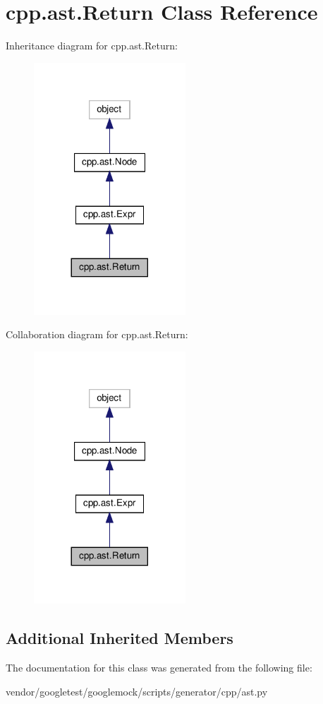 \hypertarget{classcpp_1_1ast_1_1_return}{}\section{cpp.\+ast.\+Return Class Reference}
\label{classcpp_1_1ast_1_1_return}


Inheritance diagram for cpp.\+ast.\+Return\+:
\nopagebreak
\begin{figure}[H]
\begin{center}
\leavevmode
\includegraphics[width=161pt]{classcpp_1_1ast_1_1_return__inherit__graph}
\end{center}
\end{figure}


Collaboration diagram for cpp.\+ast.\+Return\+:
\nopagebreak
\begin{figure}[H]
\begin{center}
\leavevmode
\includegraphics[width=161pt]{classcpp_1_1ast_1_1_return__coll__graph}
\end{center}
\end{figure}
\subsection*{Additional Inherited Members}


The documentation for this class was generated from the following file\+:\begin{DoxyCompactItemize}
\item 
vendor/googletest/googlemock/scripts/generator/cpp/ast.\+py\end{DoxyCompactItemize}
